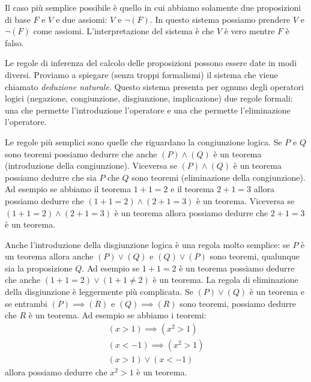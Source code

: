 Il caso più semplice possibile è quello in cui abbiamo 
solamente due proposizioni di base $F$ e $V$ e due assiomi: 
$V$ e $\lnot (F)$. 
In questo sistema possiamo prendere $V$ e $\lnot (F)$ 
come assiomi.
L'interpretazione del sistema è che $V$ è vero mentre $F$ è falso.

Le regole di inferenza del calcolo delle proposizioni
possono essere date in modi diversi. 
%
%
Proviamo a spiegare (senza troppi formalismi) il sistema 
che viene chiamato \emph{deduzione naturale}. 
Questo sistema presenta per ognuno degli operatori logici
(negazione, congiunzione, disgiunzione, implicazione) 
due regole formali: una che permette l'introduzione l'operatore e una 
che permette l'eliminazione l'operatore.

Le regole più semplici sono quelle che riguardano la congiunzione 
logica. Se $P$ e $Q$ sono teoremi possiamo dedurre che anche 
$(P)\land (Q)$ è un teorema (introduzione della congiunzione).
%
%
%
Viceversa se $(P)\land (Q)$ è un teorema possiamo dedurre 
che sia $P$ che $Q$ sono teoremi (eliminazione della congiunzione).
%
%
Ad esempio se abbiamo il teorema $1+1=2$ e il teorema $2+1=3$ 
allora possiamo dedurre che $(1+1=2) \land (2+1=3)$ è un teorema.
Viceversa se $(1+1=2)\land (2+1=3)$ è un teorema allora possiamo 
dedurre che $2+1=3$ è un teorema.

Anche l'introduzione della disgiunzione logica è una regola 
%
molto semplice: se $P$ è un teorema allora anche $(P)\lor (Q)$ 
e $(Q)\lor (P)$ sono teoremi, qualunque sia la proposizione $Q$.
%
%
Ad esempio se $1+1=2$ è un teorema possiamo dedurre 
che anche $(1+1=2) \lor (1+1\neq 2)$ è un teorema.
La regola di eliminazione della disgiunzione è leggermente 
%
più complicata. Se  $(P)\lor (Q)$ è un teorema e se entrambi 
$(P)\implies (R)$ e $(Q)\implies (R)$ sono teoremi, possiamo 
dedurre che $R$ è un teorema.
Ad esempio se abbiamo i teoremi: 
\[
\begin{gathered}
  (x>1) \implies (x^2>1)\\ 
  (x<-1) \implies (x^2>1)\\  
  (x>1) \lor (x<-1)
\end{gathered}
\]
allora possiamo dedurre che $x^2>1$ 
è un teorema.

